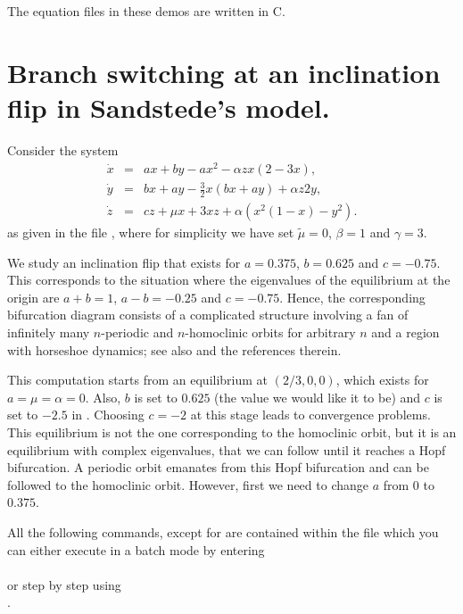 \documentclass[12pt]{report}
\begin{document}
The equation files in these demos are written in C.

\section{ Branch switching at an inclination flip in Sand\-stede's
  model.}
\label{sec:HomCont_hbs_san}
Consider the system \cite{Sa:95b}
\begin{equation} \begin{array}{rcl}
\dot{x} & = & a x + b y - a x^2 - \alpha z x (2-3x), \\
\dot{y} & = & b x + a y - \frac{3}{2} x (b x + a y) + \alpha z 2 y, \\
\dot{z} & = & c z + \mu x + 3 x z + \alpha (x^2 (1-x) - y^2).
\end{array} \end{equation}
as given in the file , where for simplicity we have
set $\tilde\mu=0$, $\beta=1$ and $\gamma=3$.

We study an inclination flip that exists for $a=0.375$,
$b=0.625$ and $c=-0.75$. This corresponds to the situation
where the eigenvalues of the equilibrium at the origin are
$a+b=1$, $a-b=-0.25$ and $c=-0.75$. Hence, the corresponding
bifurcation diagram consists of a complicated structure involving a
fan of infinitely many $n$-periodic and $n$-homoclinic orbits
for arbitrary $n$ and a region with horseshoe dynamics; see
also  and the references therein.

This computation starts from an equilibrium at $(2/3,0,0)$, which
exists for $a=\mu=\alpha=0$. Also, $b$ is set to $0.625$ (the value
we would like it to be) and $c$ is set to $-2.5$ in .
Choosing $c=-2$ at this stage leads to convergence problems.
This equilibrium is not the one corresponding to the homoclinic orbit,
but it is an equilibrium with complex eigenvalues, that we can follow
until it reaches a Hopf bifurcation. A periodic orbit emanates from 
this Hopf bifurcation and can be followed to the homoclinic orbit.
However, first we need to change $a$ from $0$ to $0.375$.

All the following commands, except for 
are contained within the file  which you can 
either execute in a batch mode by entering\\
\\
or step by step using\\
.
\end{document}
